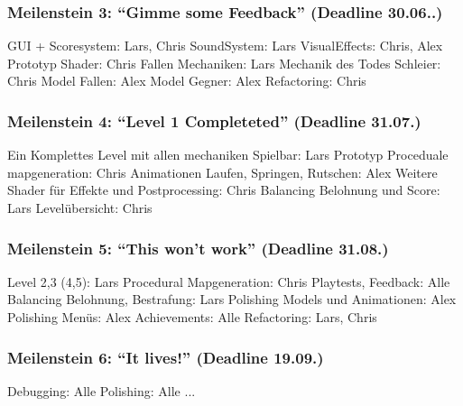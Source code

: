 \documentclass{article}
\begin{document}
\subsubsection{Meilenstein 3: “Gimme some Feedback” (Deadline 30.06..)}
GUI + Scoresystem: Lars, Chris\newline
SoundSystem: Lars\newline
VisualEffects: Chris, Alex\newline
Prototyp Shader: Chris\newline
Fallen Mechaniken: Lars\newline
Mechanik des Todes Schleier: Chris\newline
Model Fallen: Alex\newline
Model Gegner: Alex\newline
Refactoring: Chris\newline
\subsubsection{Meilenstein 4: “Level 1 Completeted” (Deadline 31.07.)}
Ein Komplettes Level mit allen mechaniken Spielbar: Lars\newline
Prototyp Proceduale mapgeneration: Chris\newline
Animationen Laufen, Springen, Rutschen: Alex\newline
Weitere Shader für Effekte und Postprocessing: Chris\newline
Balancing Belohnung und Score: Lars\newline
Levelübersicht: Chris\newline
\subsubsection{ Meilenstein 5: “This won’t work” (Deadline 31.08.)}
Level 2,3 (4,5): Lars\newline
Procedural Mapgeneration: Chris\newline
Playtests, Feedback: Alle\newline
Balancing Belohnung, Bestrafung: Lars\newline
Polishing Models und Animationen: Alex\newline
Polishing Menüs: Alex\newline
Achievements: Alle\newline
Refactoring: Lars, Chris\newline
\subsubsection{Meilenstein 6: “It lives!” (Deadline 19.09.)}
Debugging: Alle\newline
Polishing: Alle\newline
...\newline

	
\end{document}
